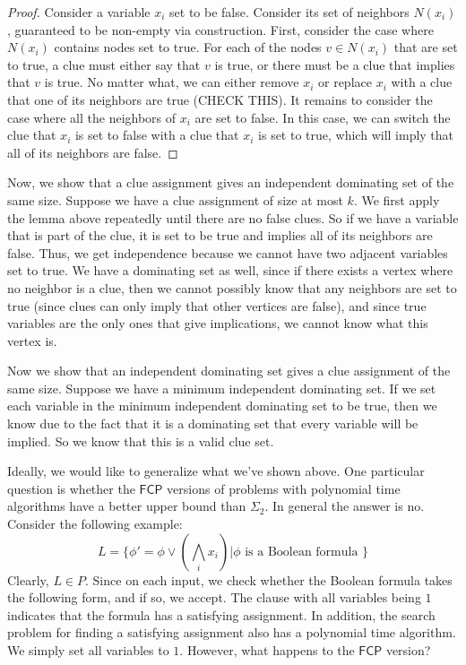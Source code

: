 \documentclass[runningheads,a4paper]{llncs}
\begin{document}
\begin{proof} 
Consider a variable $x_i$ set to be false. Consider its set of neighbors $N(x_i)$, guaranteed to be non-empty via construction. First, consider the case where $N(x_i)$ contains nodes set to true. For each of the nodes $v \in N(x_i)$ that are set to true, a clue must either say that $v$ is true, or there must be a clue that implies that $v$ is true. No matter what, we can either remove $x_i$ or replace $x_i$ with a clue that one of its neighbors are true (CHECK THIS). It remains to consider the case where all the neighbors of $x_i$ are set to false. In this case, we can switch the clue that $x_i$ is set to false with a clue that $x_i$ is set to true, which will imply that all of its neighbors are false.
\end{proof}

Now, we show that a clue assignment gives an independent dominating set of the same size. Suppose we have a clue assignment of size at most $k$. We first apply the lemma above repeatedly until there are no false clues. So if we have a variable that is part of the clue, it is set to be true and implies all of its neighbors are false. Thus, we get independence because we cannot have two adjacent variables set to true. We have a dominating set as well, since if there exists a vertex where no neighbor is a clue, then we cannot possibly know that any neighbors are set to true (since clues can only imply that other vertices are false), and since true variables are the only ones that give implications, we cannot know what this vertex is. 

Now we show that an independent dominating set gives a clue assignment of the same size. Suppose we have a minimum independent dominating set. If we set each variable in the minimum independent dominating set to be true, then we know due to the fact that it is a dominating set that every variable will be implied. So we know that this is a valid clue set.

Ideally, we would like to generalize what we've shown above. One particular question is whether the $\mathsf{FCP}$ versions of problems with polynomial time algorithms have a better upper bound than $\Sigma_2$. In general the answer is no. Consider the following example:
\[ L = \{ \phi' = \phi \vee \left( \bigwedge_i x_i \right) | \phi \text{ is a Boolean formula }\} \]
Clearly, $L \in P$. Since on each input, we check whether the Boolean formula takes the following form, and if so, we accept. The clause with all variables being $1$ indicates that the formula has a satisfying assignment. In addition, the search problem for finding a satisfying assignment also has a polynomial time algorithm. We simply set all variables to $1$. However, what happens to the $\mathsf{FCP}$ version?
\end{document}
